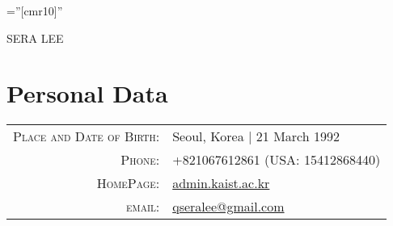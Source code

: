 \documentclass[a4paper,10pt]{article}
\begin{document}

\pagestyle{empty} %

\font\fb=''[cmr10]'' %

\par{\centering
		{\Huge SERA \textsc{LEE}
	}\bigskip\par}

\section{Personal Data}

\begin{tabular}{rl}
    \textsc{Place and Date of Birth:} & Seoul, Korea  | 21 March 1992 \\
    \textsc{Phone:}     & +821067612861 (USA: 15412868440)\\
    \textsc{HomePage:}     & \href{http://admin.kaist.ac.kr}{admin.kaist.ac.kr}\\
    \textsc{email:}     & \href{mailto:qseralee@gmail.com}{qseralee@gmail.com}
\end{tabular}

\end{document}
